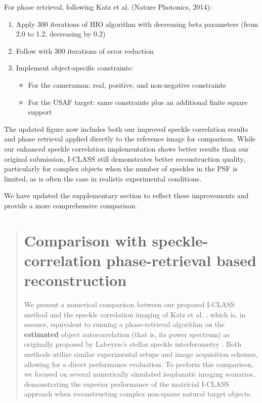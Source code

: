 \documentclass[12pt]{article}
\newenvironment{ourresponse}
    {\begin{tcolorbox}[width=\linewidth,breakable,enhanced,colback=gray!5,colframe=responsecolor!50,title=Response,left=5pt,right=5pt]}
    {\end{tcolorbox}}
\begin{document}
\begin{ourresponse}
            For phase retrieval, following Katz et al. (Nature Photonics, 2014):
            \begin{enumerate}
                \item Apply 300 iterations of HIO algorithm with decreasing beta parameters (from 2.0 to 1.2, decreasing by 0.2)
                \item Follow with 300 iterations of error reduction
                \item Implement object-specific constraints:
                \begin{itemize}
                    \item  For the cameraman: real, positive, and non-negative constraints
                    \item  For the USAF target: same constraints plus an additional finite square support
                \end{itemize}
            \end{enumerate}
            
            
            The updated figure now includes both our improved speckle correlation results and phase retrieval applied directly to the reference image for comparison. While our enhanced speckle correlation implementation shows better results than our original submission, I-CLASS still demonstrates better reconstruction quality, particularly for complex objects when the number of speckles in the PSF is limited, as is often the case in realistic experimental conditions.
            
            We have updated the supplementary section to reflect these improvements and provide a more comprehensive comparison.

                        \begin{quote}
                \section*{Comparison with speckle-correlation phase-retrieval based reconstruction}

                We present a numerical comparison between our proposed I-CLASS method and the speckle correlation imaging of Katz et al. \cite{katz14}, which is, in essence, equivalent to running a phase-retrieval algorithm on the \textbf{estimated} object autocorrelation (that is, its power spectrum) as originally proposed by Labeyrie's stellar speckle interferometry \cite{labeyrie1970attainment}. 
                Both methods utilize similar experimental setups and image acquisition schemes, allowing for a direct performance evaluation. To perform this comparison, we focused on several numerically simulated isoplanatic imaging scenarios, demonstrating the superior performance of the matricial I-CLASS approach when reconstructing complex non-sparse natural target objects.
                

\end{quote}
\end{ourresponse}
\end{document}
